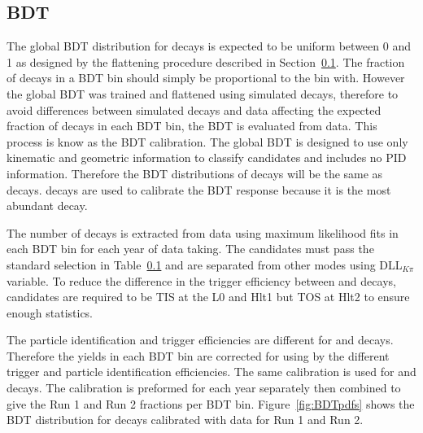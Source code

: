 \subsection{BDT \pdfs}
The global BDT distribution for \bmumu decays is expected to be uniform between 0 and 1 as designed by the flattening procedure described in Section~\ref{}. The fraction of \bmumu decays in a BDT bin should simply be proportional to the bin with. However the global BDT was trained and flattened using simulated decays, therefore to avoid differences between simulated decays and data affecting the expected fraction of \bmumu decays in each BDT bin, the BDT \pdf is evaluated from data. This process is know as the BDT calibration.
The global BDT is designed to use only kinematic and geometric information to classify candidates and includes no PID information. Therefore the BDT distributions of \bhh decays will be the same as \bmumu decays. \bdkpi decays are used to calibrate the BDT response because it is the most abundant \bhh decay. 

The number of \bdkpi decays is extracted from data using maximum likelihood fits in each BDT bin for each year of data taking. The \bdkpi candidates must pass the standard \bhh selection in Table~\ref{} and are separated from other \bhh modes using  DLL$_{K\pi}$ variable. To reduce the difference in the trigger efficiency between \bdkip and \bmumu decays, \bdkpi candidates are required to be TIS at the L0 and Hlt1 but TOS at Hlt2 to ensure enough statistics.

The particle identification and trigger efficiencies are different for \bdkpi and \bmumu decays. Therefore the \bdkpi yields in each BDT bin are corrected for using by the different trigger and particle identification efficiencies. The same calibration is used for \bsmumu and \bdmumu decays.
The calibration is preformed for each year separately then combined to give the Run 1 and Run 2 fractions per BDT bin. Figure~\ref{fig:BDTpdfs} shows the BDT distribution for \bmumu decays calibrated with \bdkpi data for Run 1 and Run 2. 

